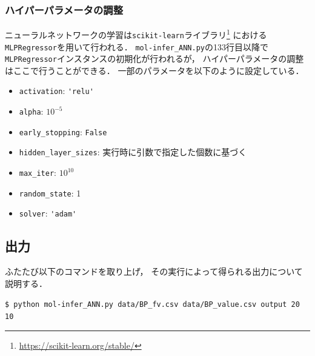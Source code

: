 \documentclass[11pt,dvipdfmx,twoside]{jarticle}
\begin{document}
\subsubsection{ハイパーパラメータの調整}
ニューラルネットワークの学習は{\tt scikit-learn}ライブラリ\footnote{\url{https://scikit-learn.org/stable/}}
における{\tt MLPRegressor}を用いて行われる．
\verb|mol-infer_ANN.py|の133行目以降で\verb|MLPRegressor|インスタンスの初期化が行われるが，
ハイパーパラメータの調整はここで行うことができる．
一部のパラメータを以下のように設定している．
\begin{itemize}
\item \verb|activation|: \verb|'relu'|
\item \verb|alpha|: $10^{-5}$
\item \verb|early_stopping|: \verb|False|
\item \verb|hidden_layer_sizes|: 実行時に引数で指定した個数に基づく
\item \verb|max_iter|: $10^{10}$
\item \verb|random_state|: 1
\item \verb|solver|: \verb|'adam'|
\end{itemize}

\subsection{出力}
ふたたび以下のコマンドを取り上げ，
その実行によって得られる出力について説明する．
\begin{oframed}
{\small
\verb|$ python mol-infer_ANN.py data/BP_fv.csv data/BP_value.csv output 20 10|
}
\end{oframed}
\end{document}
